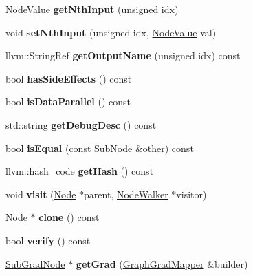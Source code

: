 \begin{DoxyCompactItemize}
\hyperlink{structglow_1_1_node_value}{Node\+Value} {\bfseries get\+Nth\+Input} (unsigned idx)
\item 
\mbox{\label{classglow_1_1_sub_node_a94a2f13022d1315cb3f385450e6e028f}} 
void {\bfseries set\+Nth\+Input} (unsigned idx, \hyperlink{structglow_1_1_node_value}{Node\+Value} val)
\item 
\mbox{\label{classglow_1_1_sub_node_a9fe36b8c70f64cf4a3a26d38ade6908e}} 
llvm\+::\+String\+Ref {\bfseries get\+Output\+Name} (unsigned idx) const
\item 
\mbox{\label{classglow_1_1_sub_node_ab4cffd9dfe017938156b18e90bfed954}} 
bool {\bfseries has\+Side\+Effects} () const
\item 
\mbox{\label{classglow_1_1_sub_node_a9ac797346aeba64710c087233a44804e}} 
bool {\bfseries is\+Data\+Parallel} () const
\item 
\mbox{\label{classglow_1_1_sub_node_a00cfa0464a91e0bdcc578bd8b170049f}} 
std\+::string {\bfseries get\+Debug\+Desc} () const
\item 
\mbox{\label{classglow_1_1_sub_node_add4a535ec2f048af7246e9bc8b2da0ce}} 
bool {\bfseries is\+Equal} (const \hyperlink{classglow_1_1_sub_node}{Sub\+Node} \&other) const
\item 
\mbox{\label{classglow_1_1_sub_node_a0e3c83364df52b91f71c0b8377449350}} 
llvm\+::hash\+\_\+code {\bfseries get\+Hash} () const
\item 
\mbox{\label{classglow_1_1_sub_node_a027209cf1a9fbcce701d7c4a833dc551}} 
void {\bfseries visit} (\hyperlink{classglow_1_1_node}{Node} $\ast$parent, \hyperlink{classglow_1_1_node_walker}{Node\+Walker} $\ast$visitor)
\item 
\mbox{\label{classglow_1_1_sub_node_a41836b9ccbbed708f07b6e49b6e1b103}} 
\hyperlink{classglow_1_1_node}{Node} $\ast$ {\bfseries clone} () const
\item 
\mbox{\label{classglow_1_1_sub_node_a7455e29af9ef3c85014c811723f31e71}} 
bool {\bfseries verify} () const
\item 
\mbox{\label{classglow_1_1_sub_node_ae034f667cad03b7202d434bd089e1729}} 
\hyperlink{classglow_1_1_sub_grad_node}{Sub\+Grad\+Node} $\ast$ {\bfseries get\+Grad} (\hyperlink{classglow_1_1_graph_grad_mapper}{Graph\+Grad\+Mapper} \&builder)
\end{DoxyCompactItemize}
